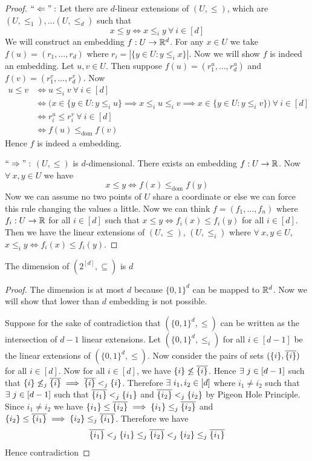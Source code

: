 \documentclass[twoside]{article}
\newcommand{\domrel}{\ensuremath{\leq_{\text{dom}}}}
\begin{document}
\begin{proof}
	$``\Leftarrow":$ Let there are $d$-linear extensions of $(U,\leq)$, which are $(U,\leq_1),\dots(U,\leq_d)$ such that $$x\leq y\iff x\leq_i y\ \forall\ i\in[d]$$We will construct an embedding $f:U\to \mathbb{R}^d$. For any $x\in U$ we take $f(u)=(r_1,\dots, r_d)$ where $r_i=|\{y\in U\colon y\leq_i x\}|$. Now we will show $f$ is indeed an embedding. Let $u,v\in U$. Then  suppose $f(u)=(r_1^u,\dots,r_d^u)$ and $f(v)=(r_1^v,\dots, r_d^v)$. Now 
	\begin{align*}
		u\leq v&\iff u\leq_i v\ \forall \ i\in[d]\\
		& \iff \Big(x\in\{y\in U\colon y\leq_i u\}\implies x\leq_i u\leq_i v\implies x\in   \{y\in U\colon y\leq_i v\}  \Big)\ \forall \ i\in[d]\\
		& \iff r_i^u\leq r_i^v\ \forall \ i\in[d]\\
		& \iff f(u)\domrel f(v)
	\end{align*}Hence $f$ is indeed a embedding. 
	
	$``\Rightarrow":$ $(U,\leq)$ is $d$-dimensional. There exists an embedding $f:U\to\mathbb{R}$. Now $\forall\ x,y\in U$ we have $$x\leq y\iff f(x)\domrel f(y)$$Now we can assume no two points of $U$ share a coordinate or else we can force this rule changing the values a little. Now we can think $f=(f_1,\dots, f_n)$ where $f_i:U\to \mathbb{R}$ for all $i\in[d]$ such that $x\leq y\iff f_i(x)\leq f_i(y)$ for all $i\in[d]$. Then we have the linear extensions of $(U,\leq)$, $(U,\leq_i)$ where $\forall\ x,y\in U$, $x\leq_i y\iff f_i(x)\leq f_i(y)$.  
\end{proof}
\begin{lemma}{}{}
	The dimension of $(2^{[d]},\subseteq)$ is $d$
\end{lemma}
\begin{proof}
	The dimension is at most $d$ because $\{0,1\}^d$ can be mapped to $\mathbb{R}^d$. Now we will show that  lower than $d$ embedding is not possible. 
	
	Suppose for the sake of contradiction that $(\{0,1\}^d,\leq )$ can be written as the intersection of $d-1$ linear extensions. Let $(\{0,1\}^d,\leq_i)$ for all $i\in[d-1]$ be the linear extensions of $(\{0,1\}^d,\leq)$. Now consider the pairs of sets $(\{i\},\overline{\{i\}})$ for all $i\in[d]$. Now for all $i\in[d]$, we have $\{i\}\not\leq \overline{\{i\}}$. Hence $\exists\ j\in[d-1]$ such that $\{i\}\not\leq_j\overline{\{i\}}\implies \overline{\{i\}}<_j\{i\}$. 	Therefore $\exists\ i_1,i_2\in[d]$ where $i_1\neq i_2$ such that $\exists\ j\in[d-1]$ such that $\overline{\{i_1\}}<_j\{i_1\}$ and $\overline{\{i_2\}}<_j\{i_2\}$ by Pigeon Hole Principle. Since $i_1\neq i_2$ we have $\{i_1\}\leq \overline{\{i_2\}}\implies \{i_1\}\leq_j\overline{\{i_2\}}$ and $\{i_2\}\leq \overline{\{i_1\}}\implies \{i_2\}\leq_j\overline{\{i_1\}}$. Therefore we have $$\overline{\{i_1\}}<_j\{i_1\}\leq_j \overline{\{i_2\}}<_j\{i_2\}\leq_j\overline{\{i_1\}}$$Hence contradiction \ctr
\end{proof}
\end{document}
